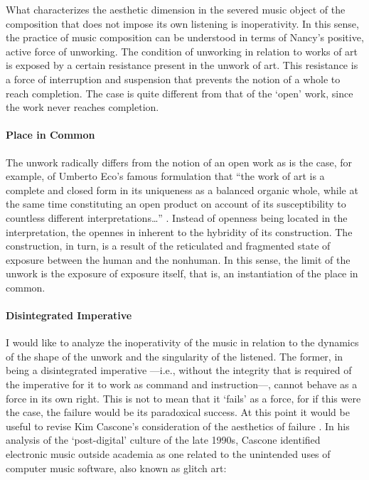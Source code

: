 What characterizes the aesthetic dimension in the severed music object of the composition that does not impose its own listening is inoperativity. In this sense, the practice of music composition can be understood in terms of Nancy's positive, active force of unworking. The condition of unworking in relation to works of art is exposed by a certain resistance present in the unwork of art. This resistance is a force of interruption and suspension that prevents the notion of a whole to reach completion. The case is quite different from that of the `open' work, since the work never reaches completion.

\paragraph{Place in Common}
The unwork radically differs from the notion of an open work as is the case, for example, of Umberto Eco's famous formulation that ``the work of art is a complete and closed form in its uniqueness as a balanced organic whole, while at the same time constituting an open product on account of its susceptibility to countless different interpretations\dots'' \parencite{Eco04:The}. Instead of openness being located in the interpretation, the opennes in inherent to the hybridity of its construction. The construction, in turn, is a result of the reticulated and fragmented state of exposure between the human and the nonhuman. In this sense, the limit of the unwork is the exposure of exposure itself, that is, an instantiation of the place in common.

\paragraph{Disintegrated Imperative}
I would like to analyze the inoperativity of the music in relation to the dynamics of the shape of the unwork and the singularity of the listened. The former, in being a disintegrated imperative ---i.e., without the integrity that is required of the imperative for it to work as command and instruction---, cannot behave as a force in its own right. This is not to mean that it `fails' as a force, for if this were the case, the failure would be its paradoxical success. At this point it would be useful to revise Kim Cascone's consideration of the aesthetics of failure \parencite{Cas00:The}. In his analysis of the `post-digital' culture of the late 1990s, Cascone identified electronic music outside academia as one related to the unintended uses of computer music software, also known as glitch art:

